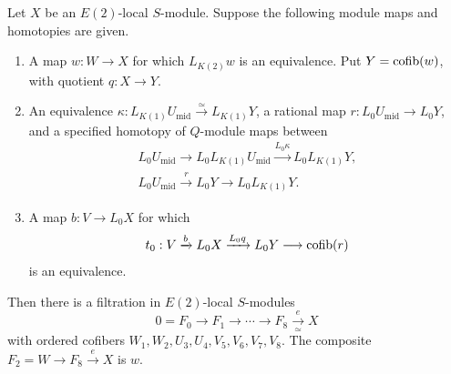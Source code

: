 \begin{proposition}\label{prop:fracture}
Let \(X\) be an \(E(2)\)-local \(S\)-module.  Suppose the
following module maps and homotopies are given.
\begin{enumerate}[label=\textup{(\roman*)}]
\item A map \(w:W\to X\) for which \(L_{K(2)}w\) is an
  equivalence.  Put \(Y=\operatorname{cofib}(w)\), with quotient \(q:X\to Y\).
\item An equivalence
  \(\kappa:L_{K(1)}U_{\mathrm{mid}}\xrightarrow{\simeq}L_{K(1)}Y\), a rational
  map \(r:L_0U_{\mathrm{mid}}\to L_0Y\), and a specified homotopy of \(Q\)-module
  maps between
  \begin{equation}\label{eq:compatibility}
  \begin{gathered}
  L_0U_{\mathrm{mid}}\longrightarrow L_0L_{K(1)}U_{\mathrm{mid}}
          \xrightarrow{L_0\kappa}L_0L_{K(1)}Y,\\
  L_0U_{\mathrm{mid}}\xrightarrow rL_0Y\longrightarrow L_0L_{K(1)}Y.
  \end{gathered}
  \end{equation}
\item A map \(b:V\to L_0X\) for which
  \begin{equation}\label{eq:quotient-basis}
  t_0:V\xrightarrow bL_0X\xrightarrow{L_0q}L_0Y
                 \longrightarrow\operatorname{cofib}(r)
  \end{equation}
  is an equivalence.
\end{enumerate}
Then there is a filtration in \(E(2)\)-local \(S\)-modules
\[
 0=F_0\longrightarrow F_1\longrightarrow\cdots\longrightarrow F_8
 \xrightarrow[\simeq]{e}X
\]
with ordered cofibers \(W_1,W_2,U_3,U_4,V_5,V_6,V_7,V_8\).
The composite \(F_2=W\to F_8\xrightarrow eX\) is \(w\).
\end{proposition}

